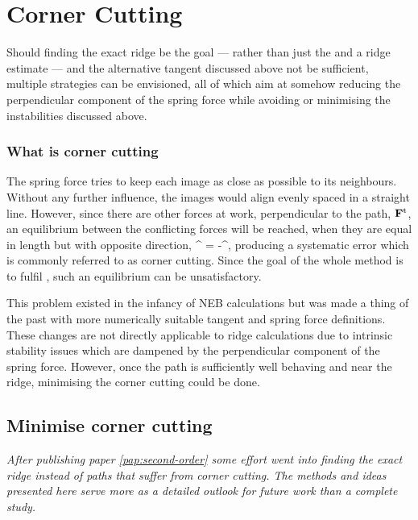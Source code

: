 \section{Corner Cutting}
\label{sec:erm-corner-cutting}

Should finding the exact ridge be the goal --- rather than just the  and a ridge estimate --- and the alternative tangent discussed above not be sufficient, multiple strategies can be envisioned, all of which aim at somehow reducing the perpendicular component of the spring force while avoiding or minimising the instabilities discussed above.

\subsubsection{What is corner cutting}
The spring force tries to keep each image as close as possible to its neighbours.
Without any further influence, the images would align evenly spaced in a straight line.
However, since there are other forces at work, perpendicular to the path, ${\mathrm{\mathbf{\bm{F}}}}^\text{t}$, an equilibrium between the conflicting forces will be reached, when they are equal in length but with opposite direction,
\vF^{\perp} = -\vF^,
\eeq
producing a systematic error which is commonly referred to as corner cutting.
Since the goal of the whole method is to fulfil , such an equilibrium can be unsatisfactory.

This problem existed in the infancy of NEB calculations but was made a thing of the past with more numerically suitable tangent and spring force definitions.~\cite{neb-tangent-2000}
These changes are not directly applicable to ridge calculations due to intrinsic stability issues which are dampened by the perpendicular component of the spring force.
However, once the path is sufficiently well behaving and near the ridge, minimising the corner cutting could be done.


\subsection{Minimise corner cutting}
\textit{After publishing paper \ref{pap:second-order} some effort went into finding the exact ridge instead of paths that suffer from corner cutting.
The methods and ideas presented here serve more as a detailed outlook for future work than a complete study.}
\vspace{1em}

